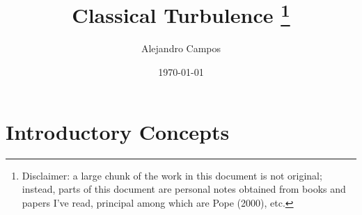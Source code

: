 \documentclass[oneside,a4paper,11pt]{report}
\title{Classical Turbulence \thanks{Disclaimer: a large chunk of the work in this document is not original; instead, parts of this document are personal notes obtained from books and papers I've read, principal among which are Pope (2000), etc.}}
\date{\today}
\author{Alejandro Campos}
\begin{document}
\maketitle
\tableofcontents

\part{Introductory Concepts}

%
\end{document}
